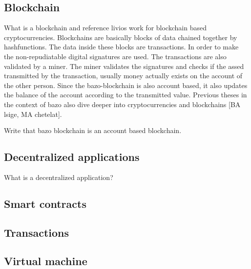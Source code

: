 \subsection{Blockchain}
What is a blockchain and reference livios work for blockchain based cryptocurrencies. Blockchains are basically blocks of data chained together by hashfunctions. The data inside these blocks are transactions. In order to make the non-repudiatable digital signatures are used. The transactions are also validated by a miner. The miner validates the signatures and checks if the assed transmitted by the transaction, usually money actually exists on the account of the other person. Since the bazo-blockchain is also account based, it also updates the balance of the account according to the transmitted value. Previous theses in the context of bazo also dive deeper into cryptocurrencies and blockchains [BA lsige, MA chetelat].

Write that bazo blockchain is an account based blockchain.

\subsection{Decentralized applications}
What is a decentralized application? 

\subsection{Smart contracts}

\subsection{Transactions}

\subsection{Virtual machine}
